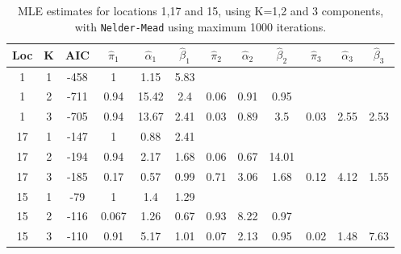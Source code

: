 \documentclass[10pt]{report}
\begin{document}
\begin{table}
\centering
\begin{tabular}{ |c|c|c||c|c|c||c|c|c||c|c|c| } 
\hline
Loc & K & AIC & $\hat\pi_1$ & $\hat\alpha_1$ & $\hat\beta_1$
& $\hat\pi_2$ & $\hat\alpha_2$ & $\hat\beta_2$
& $\hat\pi_3$ & $\hat\alpha_3$ & $\hat\beta_3$\\
\hline
 \hline
1 & 1 & -458 & 1 & 1.15 & 5.83
& & &
& & & \\

1 & 2 & -711 & 0.94 & 15.42 &  2.4
& 0.06 & 0.91 & 0.95
& & &\\

1 & 3 & -705 & 0.94 & 13.67 & 2.41
& 0.03 & 0.89 &  3.5
& 0.03 & 2.55 & 2.53 \\
\hline
17 & 1 & -147 & 1 & 0.88 & 2.41
& & &
& & &\\

17 & 2 & -194 & 0.94 & 2.17 & 1.68
 &  0.06 & 0.67  & 14.01
 & & &\\
 
17 & 3 & -185 & 0.17  &  0.57  &   0.99
& 0.71  & 3.06 & 1.68
 & 0.12 & 4.12 & 1.55\\
 \hline
15 & 1 & -79 & 1 & 1.4 & 1.29
& & &
& & &\\

15 & 2 & -116 & 0.067 & 1.26 & 0.67
& 0.93 & 8.22 & 0.97
& & &\\

15 & 3 & -110 & 0.91 & 5.17 & 1.01
& 0.07 & 2.13 & 0.95
&  0.02 & 1.48  & 7.63 \\
 \hline
\end{tabular}
\caption{MLE estimates for locations 1,17 and 15, using K=1,2 and 3 components, with \texttt{Nelder-Mead} using maximum 1000 iterations.}
\label{table:estimates}
\end{table}



\end{document}
